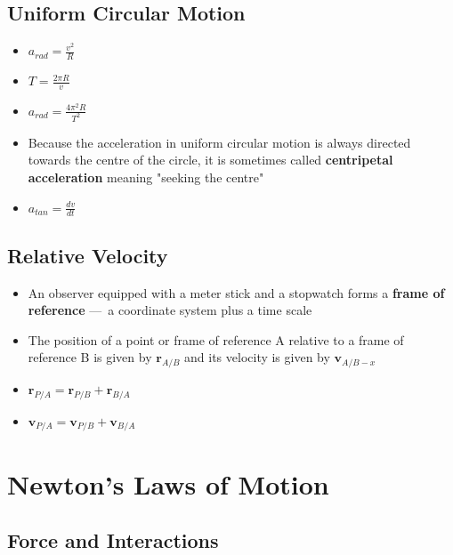 \documentclass{article}
\begin{document}
\setcounter{subsection}{3}
\subsection{Uniform Circular Motion}

\begin{itemize}
    \item $a_{rad}=\frac{v^2}{R}$

    \item $T=\frac{2\pi R}{v}$

    \item $a_{rad}=\frac{4\pi^2R}{T^2}$

    \item Because the acceleration in uniform circular motion is always directed towards the centre of the circle, it is sometimes called \textbf{centripetal acceleration} meaning "seeking the centre"

    \item $a_{tan}=\frac{dv}{dt}$
\end{itemize}

\subsection{Relative Velocity}

\begin{itemize}
    \item An observer equipped with a meter stick and a stopwatch forms a \textbf{frame of reference} — a coordinate system plus a time scale

    \item The position of a point or frame of reference A relative to a frame of reference B is given by $\mathbf{r}_{A/B}$ and its velocity is given by $\mathbf{v}_{A/B-x}$

    \item $\mathbf{r}_{P/A}=\mathbf{r}_{P/B}+\mathbf{r}_{B/A}$

    \item $\mathbf{v}_{P/A}=\mathbf{v}_{P/B}+\mathbf{v}_{B/A}$
\end{itemize}

\section{Newton's Laws of Motion}

\subsection{Force and Interactions}
\end{document}
